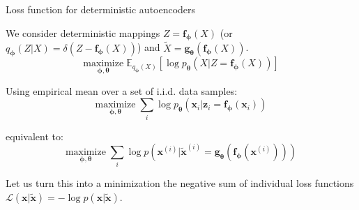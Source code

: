 \documentclass{beamer}
\begin{document}
  \begin{frame}{Loss function for deterministic autoencoders}

    We consider \alert{deterministic} mappings $Z = \mathbf{f}_{\boldsymbol{\phi}}(X)$ (or $q_{\boldsymbol{\phi}}(Z|X) = \delta(Z - \mathbf{f}_{\boldsymbol{\phi}}(X))$) and $\tilde{X} = \mathbf{g}_{\boldsymbol{\theta}}(\mathbf{f}_{\boldsymbol{\phi}}(X))$.
    \vspace{0cm}
    \begin{equation*}
      \underset{\boldsymbol{\phi},\boldsymbol{\theta}}{\text{maximize}} \; \mathbb{E}_{q_{\boldsymbol{\phi}}(X)}\left[\log p_{\boldsymbol{\theta}}(X|Z = \mathbf{f}_{\boldsymbol{\phi}}(X))\right]
    \end{equation*}

    Using empirical mean over a set of i.i.d. data samples:
    \vspace{0cm}
    \begin{equation*}
      \underset{\boldsymbol{\phi},\boldsymbol{\theta}}{\text{maximize}} \; \sum_i \log p_{\boldsymbol{\theta}}(\mathbf{x}_i|\mathbf{z}_i = \mathbf{f}_{\boldsymbol{\phi}}(\mathbf{x}_i))
    \end{equation*}

    equivalent to:
    \vspace{0cm}
    \begin{equation*}
      \underset{\boldsymbol{\phi},\boldsymbol{\theta}}{\text{maximize}} \; \sum_i \log p(\mathbf{x}^{(i)}|\tilde{\mathbf{x}}^{(i)} = \mathbf{g}_{\boldsymbol{\theta}}(\mathbf{f}_{\boldsymbol{\phi}}(\mathbf{x}^{(i)})))
    \end{equation*}

    Let us turn this into a minimization the negative sum of individual loss functions $\mathcal{L}(\mathbf{x}|\tilde{\mathbf{x}}) = -\log p(\mathbf{x}|\tilde{\mathbf{x}})$.
    
  \end{frame}
\end{document}
